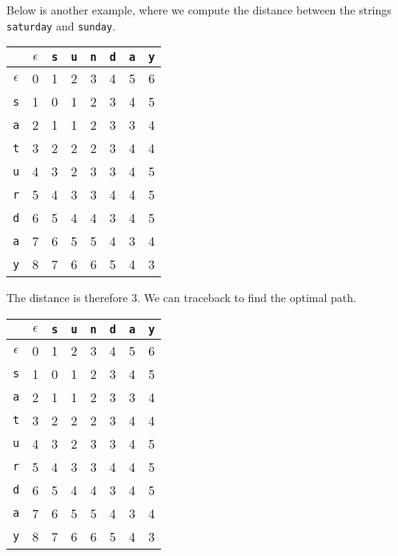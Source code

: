 \documentclass[a4paper, openany]{memoir}
\begin{document}
Below is another example, where we compute the distance between the strings \texttt{saturday} and \texttt{sunday}.
\begin{table}[H]
    \centering
    \begin{tabular}{|c|c|c|c|c|c|c|c|}
        \hline
        & $\epsilon$ & \texttt{s} & \texttt{u} & \texttt{n} & \texttt{d} & \texttt{a} & \texttt{y} \\
        \hline
        $\epsilon$ & 0 & 1 & 2 & 3 & 4 & 5 & 6 \\
        \hline
        \texttt{s} & 1 & 0 & 1 & 2 & 3 & 4 & 5 \\
        \hline
        \texttt{a} & 2 & 1 & 1 & 2 & 3 & 3 & 4 \\
        \hline
        \texttt{t} & 3 & 2 & 2 & 2 & 3 & 4 & 4 \\
        \hline
        \texttt{u} & 4 & 3 & 2 & 3 & 3 & 4 & 5 \\
        \hline
        \texttt{r} & 5 & 4 & 3 & 3 & 4 & 4 & 5 \\
        \hline
        \texttt{d} & 6 & 5 & 4 & 4 & 3 & 4 & 5 \\
        \hline
        \texttt{a} & 7 & 6 & 5 & 5 & 4 & 3 & 4 \\
        \hline
        \texttt{y} & 8 & 7 & 6 & 6 & 5 & 4 & 3 \\
        \hline
    \end{tabular}
\end{table}
\noindent The distance is therefore 3. We can traceback to find the optimal path.
\begin{table}[H]
    \centering
    \begin{tabular}{|c|c|c|c|c|c|c|c|}
        \hline
        & $\epsilon$ & \texttt{s} & \texttt{u} & \texttt{n} & \texttt{d} & \texttt{a} & \texttt{y} \\
        \hline
        $\epsilon$ & {\color{red} 0} & 1 & 2 & 3 & 4 & 5 & 6 \\
        \hline
        \texttt{s} & 1 & {\color{red} 0} & 1 & 2 & 3 & 4 & 5 \\
        \hline
        \texttt{a} & 2 & {\color{red} 1} & 1 & 2 & 3 & 3 & 4 \\
        \hline
        \texttt{t} & 3 & {\color{red} 2} & 2 & 2 & 3 & 4 & 4 \\
        \hline
        \texttt{u} & 4 & 3 & {\color{red} 2} & 3 & 3 & 4 & 5 \\
        \hline
        \texttt{r} & 5 & 4 & 3 & {\color{red} 3} & 4 & 4 & 5 \\
        \hline
        \texttt{d} & 6 & 5 & 4 & 4 & {\color{red} 3} & 4 & 5 \\
        \hline
        \texttt{a} & 7 & 6 & 5 & 5 & 4 & {\color{red} 3} & 4 \\
        \hline
        \texttt{y} & 8 & 7 & 6 & 6 & 5 & 4 & {\color{red} 3} \\
        \hline
    \end{tabular}
\end{table}
\end{document}

